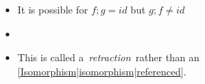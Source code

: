 
\begin{itemize}
    \item It is possible for $f;g=id$ but $g;f \ne id$
    \item {}
    \item This is called a \,\emph{retraction}\, rather than an \ref{Isomorphism|isomorphism|referenced}.
  \end{itemize}
